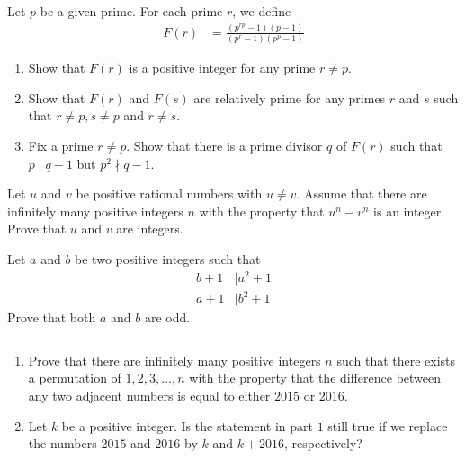 \documentclass[problems.tex]{subfile}
\begin{document}
	\begin{problem}
		Let $p$ be a given prime. For each prime $r$, we define
		\begin{align*}
			F(r) &= \frac{(p^{rp} -1)(p-1)}{(p^r-1)(p^p-1)}
		\end{align*}
		\begin{enumerate}
			\item Show that $F(r)$ is a positive integer for any prime $r \neq p$.
			\item Show that $F(r)$ and $F(s)$ are relatively prime for any primes $r$ and $s$ such that $r \neq p, s\neq p$ and $r \neq s$.
			\item Fix a prime $r \neq p$. Show that there is a prime divisor $q$ of $F(r)$ such that $p \mid q - 1$ but $p^2 \nmid q - 1$.
		\end{enumerate}
	\end{problem}

	\begin{problem}
		Let $u$ and $v$ be positive rational numbers with $u \neq v$. Assume that there are infinitely many positive integers $n$ with the property that $u^n - v^n$ is an integer. Prove that $u$ and $v$ are integers.
	\end{problem}

	\begin{problem}
		Let $a$ and $b$ be two positive integers such that
		\begin{align*}
			b + 1
				& \mid a^2 + 1\\
			a + 1
				& \mid b^2 + 1
		\end{align*}
		Prove that both $a$ and $b$ are odd.
	\end{problem}


	\begin{problem}
		$ $
		\begin{enumerate}
			\item Prove that there are infinitely many positive integers $n$ such that there exists a permutation of $1, 2,3, \dots, n$ with the property that the difference between any two adjacent numbers is equal to either $2015$ or $2016$.
			\item Let $k$ be a positive integer. Is the statement in part $1$ still true if we replace the numbers $2015$ and $2016$ by $k$ and $k + 2016$, respectively?
		\end{enumerate}
	\end{problem}
\end{document}
